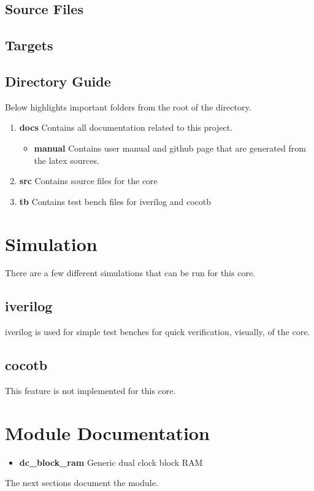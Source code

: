 \subsection{Source Files}



\subsection{Targets}



\subsection{Directory Guide}

\par
Below highlights important folders from the root of the directory.

\begin{enumerate}
  \item \textbf{docs} Contains all documentation related to this project.
    \begin{itemize}
      \item \textbf{manual} Contains user manual and github page that are generated from the latex sources.
    \end{itemize}
  \item \textbf{src} Contains source files for the core
  \item \textbf{tb} Contains test bench files for iverilog and cocotb
\end{enumerate}

\newpage

\section{Simulation}
\par
There are a few different simulations that can be run for this core.

\subsection{iverilog}
\par
iverilog is used for simple test benches for quick verification, visually, of the core.

\subsection{cocotb}
\par
This feature is not implemented for this core.

\newpage

\section{Module Documentation} \label{Module Documentation}

\begin{itemize}
\item \textbf{dc\_block\_ram} Generic dual clock block RAM\\
\end{itemize}
The next sections document the module.

